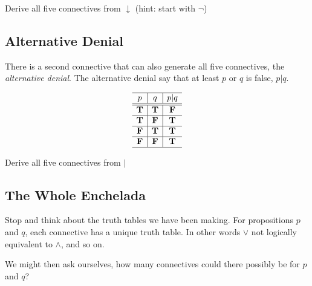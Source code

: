   \newpage  
\begin{problem}Derive all five connectives from $\downarrow$ (hint: start with $\neg$)
\end{problem}

\subsection*{Alternative Denial}
There is a second connective that can also generate all five connectives, the \emph{alternative denial}.  The alternative denial say that at least $p$ or $q$ is false, $p |  q$.  


\[  \begin{array}{c|c|c}
  \hline  
  p & q & p| q\\
  \hline
  \hline
 \mathbf{T} &  \mathbf{T} &  \mathbf{F}\\
  \hline
 \mathbf{T} &  \mathbf{F} &  \mathbf{T}\\
  \hline
 \mathbf{F} &  \mathbf{T} &  \mathbf{T}\\
  \hline
 \mathbf{F} &  \mathbf{F} &  \mathbf{T}\\
    \hline
    \end{array}\]
    
\begin{problem}
Derive all five connectives from $|$ 
\end{problem}

\subsection*{The Whole Enchelada}
Stop and think about the truth tables we have been making.  For propositions $p$ and $q$, each connective has a unique truth table.   In other words $\lor$ not logically equivalent to $\land$, and so on.  

\begin{problem}
We might then ask ourselves, how many connectives could there possibly be for $p$ and $q$?
\end{problem}


